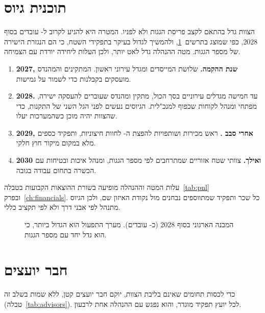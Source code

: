 \section{תוכנית גיוס}

הצוות גדל בהתאם לקצב פריסת הגגות ולא לפניו. המטרה היא להגיע לקרוב ל-\RRheadcount{} עובדים בסוף 2028, כפי שמוצג בתרשים~\ref{fig:orgchart}, ולהמשיך לגדול בעיקר בתפקידי השטח, כי הם הנגזרת הישירה של מספר הגגות. מטה ההנהלה גדל לאט יותר, ולכן העלות ליחידה יורדת עם הצמיחה.

\begin{enumerate}
  \item \textbf{2027, שנת ההקמה.} שלושת המייסדים ומגדל עירוני ראשון. המתקינים והמהנדס מועסקים בקבלנות כדי לשמור על גמישות.
  \item \textbf{2028.} עד חמישה מגדלים עירוניים בסך הכול, מתקין ומהנדס שעוברים להעסקה ישירה, מפתחי  ומנהל לקוחות  שכפוף למנכ"לית. הגיוסים נעשים לפני הגל השני של התקנות, כדי שהצוות יהיה מוכן כשהמערכות יעלו.
  \item \textbf{2029, אחרי סבב .} ראש מכירות ושותפויות להפצת ה- לחוות חיצוניות, ותפקיד כספים מלא במקום מיקור חוץ חלקי.
  \item \textbf{2030 ואילך.} צוותי שטח אזוריים שמתרחבים לפי מספר הגגות, ומנהל איכות ובטיחות עם הכשרה בתחום עבודה בגובה.
\end{enumerate}

עלות המטה וההנהלה מופיעה בשורת ההוצאות הקבועות בטבלה~\ref{tab:pnl} ובפרק~\ref{ch:financials}. כל שכר ותפקיד שמתווספים נבחנים מול נקודת האיזון שם, ולכן הגיוס מתנהל לפי אבני דרך ולא לפי תקציב כללי.

\begin{figure}[htbp]
\centering
\resizebox{\linewidth}{!}{}
\caption{המבנה הארגוני בסוף 2028 (כ-\RRheadcount{} עובדים). מערך התפעול הוא הגדול ביותר, כי הוא גדל יחד עם מספר הגגות.}
\label{fig:orgchart}
\end{figure}

\section{חבר יועצים}

כדי לכסות תחומים שאינם בליבת הצוות, יוקם חבר יועצים קטן, ללא שמות בשלב זה (טבלה~\ref{tab:advisors}). לכל יועץ תפקיד מוגדר, והוא נפגש עם ההנהלה אחת לרבעון.

